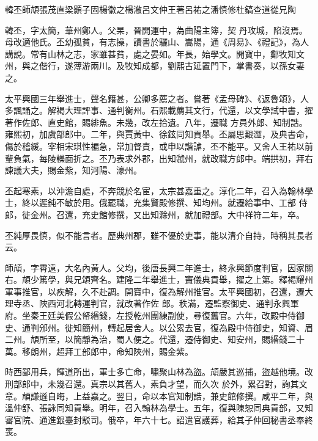 
\begin{pinyinscope}

 韓丕師頏張茂直梁顥子固楊徽之楊澈呂文仲王著呂祐之潘慎修杜鎬查道從兄陶



 韓丕，字太簡，華州鄭人。父杲，晉開運中，為曲陽主簿，契
 丹攻城，陷沒焉。母改適他氏。丕幼孤貧，有志操，讀書於驪山、嵩陽，通《周易》、《禮記》，為人講說。常有山林之志，家雖甚貧，處之晏如。年長，始學文。開寶中，鄭牧知文州，與之偕行，遂薄游兩川。及牧知成都，劉熙古延置門下，掌書奏，以孫女妻之。



 太平興國三年舉進士，聲名籍甚，公卿多薦之者。嘗著《孟母碑》、《返魯頌》，人多諷誦之。解褐大理評事、通判衡州。石熙載薦其文行，代還，以文學試中書，擢著作佐郎、直史館，賜緋魚。未幾，改左拾遺。八年，遷職
 方員外郎、知制誥。雍熙初，加虞部郎中。二年，與賈黃中、徐鉉同知貢舉。丕屬思艱澀，及典書命，傷於稽緩。宰相宋琪性褊急，常加督責，或申以諧謔，丕不能平。又舍人王祐以前輩負氣，每陵轢面折之。丕乃表求外郡，出知虢州，就改職方郎中。端拱初，拜右諫議大夫，賜金紫，知河陽、濠州。



 丕起寒素，以沖澹自處，不奔競於名宦，太宗甚嘉重之。淳化二年，召入為翰林學士，終以遲鈍不敏於用。俄罷職，充集賢殿修撰、知均州。就遷給事中、工部
 侍郎，徙金州。召還，充史館修撰，又出知滁州，就加禮部。大中祥符二年，卒。



 丕純厚畏慎，似不能言者。歷典州郡，雖不優於吏事，能以清介自持，時稱其長者云。



 師頏，字霄遠，大名內黃人。父均，後唐長興二年進士，終永興節度判官，因家關右。頏少篤學，與兄頌齊名。建隆二年舉進士，竇儀典貢舉，擢之上第。釋褐耀州軍事推官，以疾解，久不赴調。開寶中，復為解州推官。太平興國初，召還，遷大理寺丞、陜西河北轉運判官，就改著作佐
 郎。秩滿，遷監察御史、通判永興軍府。坐秦王廷美假公帑緡錢，左授乾州團練副使，尋復舊官。六年，改殿中侍御史、通判邠州。徙知簡州，轉起居舍人。以公累去官，復為殿中侍御史，知資、眉二州。頏所至，以簡靜為治，蜀人便之。代還，遷侍御史、知安州，賜緡錢二十萬。移朗州，超拜工部郎中，命知陜州，賜金紫。



 時西鄙用兵，餫道所出，軍士多亡命，嘯聚山林為盜。頏嚴其巡捕，盜越他境。改刑部郎中，未幾召還。真宗以其舊人，素負才望，而久次
 於外，累召對，詢其文章。頏謙遜自晦，上益嘉之。翌日，命以本官知制誥，兼史館修撰。咸平二年，與溫仲舒、張詠同知貢舉。明年，召入翰林為學士。五年，復與陳恕同典貢部，又知審官院、通進銀臺封駁司。俄卒，年六十七。詔遣官護葬，給其子仲回秘書丞奉終喪。




\end{pinyinscope}
